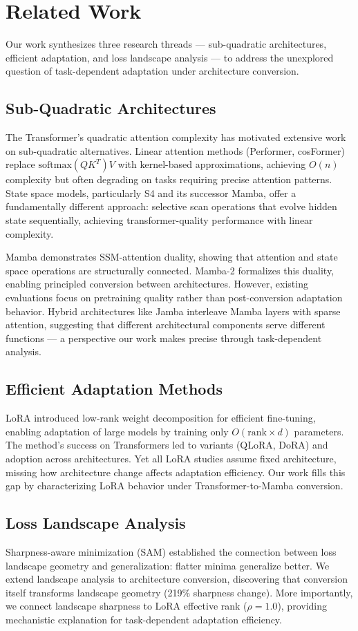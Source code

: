 \section{Related Work}

Our work synthesizes three research threads --- sub-quadratic architectures, efficient adaptation, and loss landscape analysis --- to address the unexplored question of task-dependent adaptation under architecture conversion.

\subsection{Sub-Quadratic Architectures}

The Transformer's quadratic attention complexity has motivated extensive work on sub-quadratic alternatives. Linear attention methods (Performer, cosFormer) replace $\text{softmax}(QK^T)V$ with kernel-based approximations, achieving $O(n)$ complexity but often degrading on tasks requiring precise attention patterns. State space models, particularly S4 and its successor Mamba, offer a fundamentally different approach: selective scan operations that evolve hidden state sequentially, achieving transformer-quality performance with linear complexity.

Mamba demonstrates SSM-attention duality, showing that attention and state space operations are structurally connected. Mamba-2 formalizes this duality, enabling principled conversion between architectures. However, existing evaluations focus on pretraining quality rather than post-conversion adaptation behavior. Hybrid architectures like Jamba interleave Mamba layers with sparse attention, suggesting that different architectural components serve different functions --- a perspective our work makes precise through task-dependent analysis.

\subsection{Efficient Adaptation Methods}

LoRA introduced low-rank weight decomposition for efficient fine-tuning, enabling adaptation of large models by training only $O(\text{rank} \times d)$ parameters. The method's success on Transformers led to variants (QLoRA, DoRA) and adoption across architectures. Yet all LoRA studies assume fixed architecture, missing how architecture change affects adaptation efficiency. Our work fills this gap by characterizing LoRA behavior under Transformer-to-Mamba conversion.

\subsection{Loss Landscape Analysis}

Sharpness-aware minimization (SAM) established the connection between loss landscape geometry and generalization: flatter minima generalize better. We extend landscape analysis to architecture conversion, discovering that conversion itself transforms landscape geometry (219\% sharpness change). More importantly, we connect landscape sharpness to LoRA effective rank ($\rho=1.0$), providing mechanistic explanation for task-dependent adaptation efficiency.

